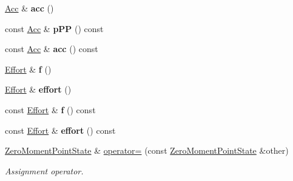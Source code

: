\begin{DoxyCompactItemize}
\item 
\hyperlink{classow__core_1_1ZeroMomentPointAcceleration}{Acc} \& {\bfseries acc} ()\hypertarget{classow__core_1_1ZeroMomentPointState_a8b26f967e93d66d53fa4f09ae01e4b92}{}\label{classow__core_1_1ZeroMomentPointState_a8b26f967e93d66d53fa4f09ae01e4b92}

\item 
const \hyperlink{classow__core_1_1ZeroMomentPointAcceleration}{Acc} \& {\bfseries p\+PP} () const \hypertarget{classow__core_1_1ZeroMomentPointState_a266b1971c7afc38375bc38f9ccd1769f}{}\label{classow__core_1_1ZeroMomentPointState_a266b1971c7afc38375bc38f9ccd1769f}

\item 
const \hyperlink{classow__core_1_1ZeroMomentPointAcceleration}{Acc} \& {\bfseries acc} () const \hypertarget{classow__core_1_1ZeroMomentPointState_a32243d1f0408a24b01890d548da33a2d}{}\label{classow__core_1_1ZeroMomentPointState_a32243d1f0408a24b01890d548da33a2d}

\item 
\hyperlink{classow__core_1_1Force}{Effort} \& {\bfseries f} ()\hypertarget{classow__core_1_1ZeroMomentPointState_a3bfe953384932eb743d1237c6e5e080f}{}\label{classow__core_1_1ZeroMomentPointState_a3bfe953384932eb743d1237c6e5e080f}

\item 
\hyperlink{classow__core_1_1Force}{Effort} \& {\bfseries effort} ()\hypertarget{classow__core_1_1ZeroMomentPointState_ab8d90ab7b27e306e2c8436aa243b2369}{}\label{classow__core_1_1ZeroMomentPointState_ab8d90ab7b27e306e2c8436aa243b2369}

\item 
const \hyperlink{classow__core_1_1Force}{Effort} \& {\bfseries f} () const \hypertarget{classow__core_1_1ZeroMomentPointState_a442c6a176466d5284f9abae450ee2955}{}\label{classow__core_1_1ZeroMomentPointState_a442c6a176466d5284f9abae450ee2955}

\item 
const \hyperlink{classow__core_1_1Force}{Effort} \& {\bfseries effort} () const \hypertarget{classow__core_1_1ZeroMomentPointState_a31dac71b3d95809fb2e3d2e9a90066a8}{}\label{classow__core_1_1ZeroMomentPointState_a31dac71b3d95809fb2e3d2e9a90066a8}

\item 
\hyperlink{classow__core_1_1ZeroMomentPointState}{Zero\+Moment\+Point\+State} \& \hyperlink{classow__core_1_1ZeroMomentPointState_a6a6b6cda50526776f5be55851e66d201}{operator=} (const \hyperlink{classow__core_1_1ZeroMomentPointState}{Zero\+Moment\+Point\+State} \&other)\hypertarget{classow__core_1_1ZeroMomentPointState_a6a6b6cda50526776f5be55851e66d201}{}\label{classow__core_1_1ZeroMomentPointState_a6a6b6cda50526776f5be55851e66d201}

\begin{DoxyCompactList}\small\item\em Assignment operator. \end{DoxyCompactList}\end{DoxyCompactItemize}
